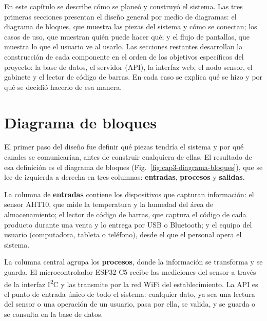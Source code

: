 
\clearpage
{}

En este capítulo se describe cómo se planeó y construyó el sistema. Las tres primeras secciones presentan el diseño general por medio de diagramas: el diagrama de bloques, que muestra las piezas del sistema y cómo se conectan; los casos de uso, que muestran quién puede hacer qué; y el flujo de pantallas, que muestra lo que el usuario ve al usarlo. Las secciones restantes desarrollan la construcción de cada componente en el orden de los objetivos específicos del proyecto: la base de datos, el servidor (API), la interfaz web, el nodo sensor, el gabinete y el lector de código de barras. En cada caso se explica qué se hizo y por qué se decidió hacerlo de esa manera.


\section{Diagrama de bloques}

El primer paso del diseño fue definir qué piezas tendría el sistema y por qué canales se comunicarían, antes de construir cualquiera de ellas. El resultado de esa definición es el diagrama de bloques (Fig.~\ref{fig:cap3-diagrama-bloques}), que se lee de izquierda a derecha en tres columnas: \textbf{entradas}, \textbf{procesos} y \textbf{salidas}.

La columna de \textbf{entradas} contiene los dispositivos que capturan información: el sensor AHT10, que mide la temperatura y la humedad del área de almacenamiento; el lector de código de barras, que captura el código de cada producto durante una venta y lo entrega por USB o Bluetooth; y el equipo del usuario (computadora, tableta o teléfono), desde el que el personal opera el sistema.

La columna central agrupa los \textbf{procesos}, donde la información se transforma y se guarda. El microcontrolador ESP32-C5 recibe las mediciones del sensor a través de la interfaz I\textsuperscript{2}C y las transmite por la red WiFi del establecimiento. La API es el punto de entrada único de todo el sistema: cualquier dato, ya sea una lectura del sensor o una operación de un usuario, pasa por ella, se valida, y se guarda o se consulta en la base de datos.

